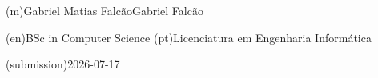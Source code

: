 %
%
\ntauthorname(m){Gabriel Matias Falcão}{Gabriel Falcão}



%
%
%
\ntauthordegree(en){BSc in Computer Science}
\ntauthordegree(pt){Licenciatura em Engenharia Informática}



%
%
%

%
%
\ntdate(submission){2026-07-17}



